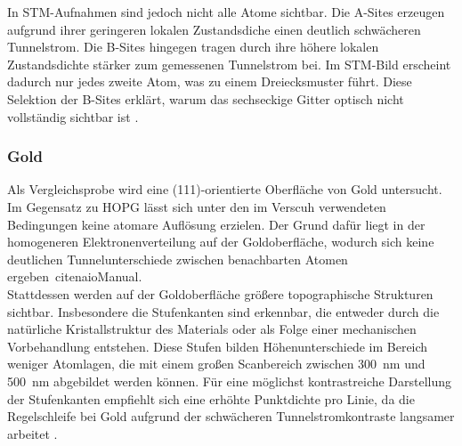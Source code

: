 In STM-Aufnahmen sind jedoch nicht alle Atome sichtbar. Die A-Sites erzeugen aufgrund ihrer geringeren lokalen Zustandsdiche einen deutlich schwächeren Tunnelstrom. 
Die B-Sites hingegen tragen durch ihre höhere lokalen Zustandsdichte stärker zum gemessenen Tunnelstrom bei. 
Im STM-Bild erscheint dadurch nur jedes zweite Atom, was zu einem Dreiecksmuster führt. Diese Selektion der B-Sites erklärt, warum das sechseckige Gitter optisch nicht vollständig sichtbar ist \cite{ScanningTunnelingMicroscopy}.

\subsubsection{Gold}
Als Vergleichsprobe wird eine (111)-orientierte Oberfläche von Gold untersucht. Im Gegensatz zu HOPG lässt sich unter den im Verscuh verwendeten Bedingungen keine atomare Auflösung erzielen. 
Der Grund dafür liegt in der homogeneren Elektronenverteilung auf der Goldoberfläche, wodurch sich keine deutlichen Tunnelunterschiede zwischen benachbarten Atomen ergeben\ cite{naioManual}.\\

Stattdessen werden auf der Goldoberfläche größere topographische Strukturen sichtbar. Insbesondere die Stufenkanten sind erkennbar, die entweder durch die natürliche Kristallstruktur des Materials oder als Folge einer mechanischen Vorbehandlung entstehen.
Diese Stufen bilden Höhenunterschiede im Bereich weniger Atomlagen, die mit einem großen Scanbereich zwischen \SI{300}{\nano\meter} und \SI{500}{\nano\meter} abgebildet werden können. Für eine möglichst kontrastreiche Darstellung der Stufenkanten empfiehlt sich eine erhöhte Punktdichte pro Linie, da die Regelschleife bei Gold aufgrund der schwächeren Tunnelstromkontraste langsamer arbeitet \cite{anleitungV42}.
